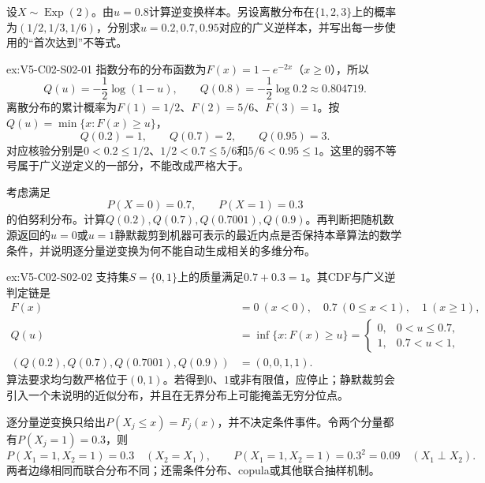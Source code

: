\begin{SLChapterExercisePairSection}
\begin{exercise}\label{ex:V5-C02-S02-01}
设$X\sim\operatorname{Exp}(2)$。由$u=0.8$计算逆变换样本。另设离散分布在$\{1,2,3\}$上的概率为$(1/2,1/3,1/6)$，分别求$u=0.2,0.7,0.95$对应的广义逆样本，并写出每一步使用的“首次达到”不等式。
\end{exercise}
\ifSLFullEdition
{}\label{sol:V5-C02-S02-01}
\begin{chapterexercisesolution}{ex:V5-C02-S02-01}
指数分布的分布函数为$F(x)=1-e^{-2x}$（$x\ge0$），所以
\[
Q(u)=-\frac12\log(1-u),
\qquad
Q(0.8)=-\frac12\log0.2\approx0.804719.
\]
离散分布的累计概率为$F(1)=1/2$、$F(2)=5/6$、$F(3)=1$。按$Q(u)=\min\{x:F(x)\ge u\}$，
\[
Q(0.2)=1,
\qquad
Q(0.7)=2,
\qquad
Q(0.95)=3.
\]
对应核验分别是$0<0.2\le1/2$、$1/2<0.7\le5/6$和$5/6<0.95\le1$。这里的弱不等号属于广义逆定义的一部分，不能改成严格大于。
\end{chapterexercisesolution}
\fi

\begin{exercise}\label{ex:V5-C02-S02-02}
考虑满足
\[
P(X=0)=0.7,\qquad P(X=1)=0.3
\]
的伯努利分布。计算$Q(0.2),Q(0.7),Q(0.7001),Q(0.9)$。再判断把随机数源返回的$u=0$或$u=1$静默裁剪到机器可表示的最近内点是否保持本章算法的数学条件，并说明逐分量逆变换为何不能自动生成相关的多维分布。
\end{exercise}
\ifSLFullEdition
{}\label{sol:V5-C02-S02-02}
\begin{chapterexercisesolution}{ex:V5-C02-S02-02}
支持集$S=\{0,1\}$上的质量满足$0.7+0.3=1$。其CDF与广义逆判定链是
\[
\begin{aligned}
F(x)&=0\ (x<0),\quad 0.7\ (0\le x<1),\quad 1\ (x\ge1),\\
Q(u)&=\inf\{x:F(x)\ge u\}
=\begin{cases}0,&0<u\le0.7,\\1,&0.7<u<1,
\end{cases}\\
(Q(0.2),Q(0.7),Q(0.7001),Q(0.9))&=(0,0,1,1).
\end{aligned}
\]
算法要求均匀数严格位于$(0,1)$。若得到$0$、$1$或非有限值，应停止；静默裁剪会引入一个未说明的近似分布，并且在无界分布上可能掩盖无穷分位点。

逐分量逆变换只给出$P(X_j\le x)=F_j(x)$，并不决定条件事件。令两个分量都有$P(X_j=1)=0.3$，则
\[
P(X_1=1,X_2=1)=0.3\quad(X_2=X_1),
\qquad
P(X_1=1,X_2=1)=0.3^2=0.09\quad(X_1\perp X_2).
\]
两者边缘相同而联合分布不同；还需条件分布、copula或其他联合抽样机制。
\end{chapterexercisesolution}
\fi


\end{SLChapterExercisePairSection}
